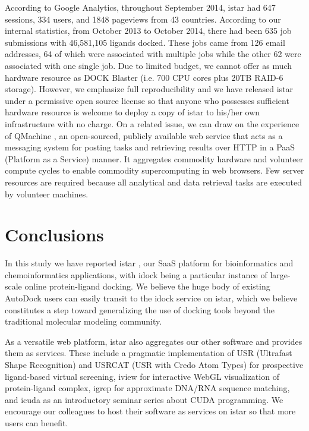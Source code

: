 According to Google Analytics, throughout September 2014, istar had 647 sessions, 334 users, and 1848 pageviews from 43 countries. According to our internal statistics, from October 2013 to October 2014, there had been 635 job submissions with 46,581,105 ligands docked. These jobs came from 126 email addresses, 64 of which were associated with multiple jobs while the other 62 were associated with one single job. Due to limited budget, we cannot offer as much hardware resource as DOCK Blaster (i.e. 700 CPU cores plus 20TB RAID-6 storage). However, we emphasize full reproducibility \citep{965} and we have released istar under a permissive open source license so that anyone who possesses sufficient hardware resource is welcome to deploy a copy of istar to his/her own infrastructure with no charge. On a related issue, we can draw on the experience of QMachine \citep{1405}, an open-sourced, publicly available web service that acts as a messaging system for posting tasks and retrieving results over HTTP in a PaaS (Platform as a Service) manner. It aggregates commodity hardware and volunteer compute cycles to enable commodity supercomputing in web browsers. Few server resources are required because all analytical and data retrieval tasks are executed by volunteer machines.

\section{Conclusions}

In this study we have reported istar \citep{1362}, our SaaS platform for bioinformatics and chemoinformatics applications, with idock \citep{1153} being a particular instance of large-scale online protein-ligand docking. We believe the huge body of existing AutoDock users can easily transit to the idock service on istar, which we believe constitutes a step toward generalizing the use of docking tools beyond the traditional molecular modeling community.

As a versatile web platform, istar also aggregates our other software and provides them as services. These include a pragmatic implementation of USR (Ultrafast Shape Recognition) \citep{1379} and USRCAT (USR with Credo Atom Types) \citep{1331} for prospective ligand-based virtual screening, iview \citep{1366} for interactive WebGL visualization of protein-ligand complex, igrep \citep{1138} for approximate DNA/RNA sequence matching, and icuda as an introductory seminar series about CUDA programming. We encourage our colleagues to host their software as services on istar so that more users can benefit.

